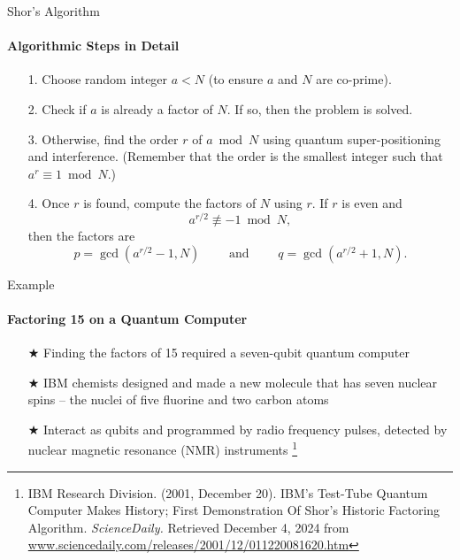 \documentclass{beamer}
\begin{document}


\begin{frame}{Shor's Algorithm}
	\framesubtitle{Algorithmic Steps in Detail}
	\begin{itemize}
		\item[1.] Choose random integer \(a < N\) (to ensure \(a\) and \(N\) are co-prime).
		\pause
		\item[2.] Check if \(a\) is already a factor of \(N\). If so, then the problem is solved.
		\pause
		\item[3.] Otherwise, find the order \(r\) of \(a \bmod N\) using quantum super-positioning and interference. (Remember that the order is the smallest integer such that \(a^r \equiv 1 \bmod N\).)
		\pause
		\item[4.] Once \(r\) is found, compute the factors of \(N\) using \(r\). If \(r\) is even and 
		\[
			a^{r/2} \not\equiv -1 \bmod N,
		\] 
		then the factors are 
		\[
			p = \gcd(a^{r/2} - 1, N) \qquad \text{ and } \qquad q = \gcd(a^{r/2} + 1, N).
		\] 
	\end{itemize}
	
\end{frame}




\begin{frame}{Example}
    \framesubtitle{Factoring 15 on a Quantum Computer}
    \begin{itemize}
        \item[$\bigstar$] Finding the factors of 15 required a seven-qubit quantum computer 
        \item[$\bigstar$] IBM chemists designed and made a new molecule that has seven nuclear spins -- the nuclei of five fluorine and two carbon atoms
        \item[$\bigstar$] Interact as qubits and programmed by radio frequency pulses, detected by nuclear magnetic resonance (NMR) instruments \footnote{IBM Research Division. (2001, December 20). IBM's Test-Tube Quantum Computer Makes History; First Demonstration Of Shor's Historic Factoring Algorithm. \textit{ScienceDaily.} Retrieved December 4, 2024 from \url{www.sciencedaily.com/releases/2001/12/011220081620.htm}} \end{itemize}
\end{frame}
\end{document}

